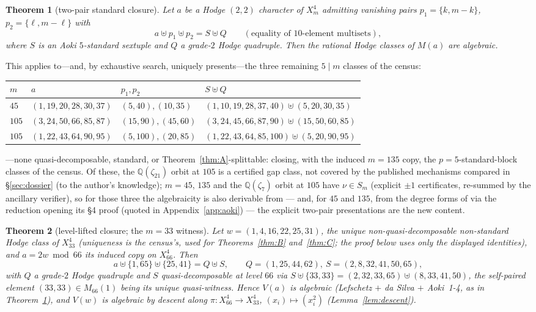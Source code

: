 \documentclass[11pt]{amsart}
\newtheorem{theorem}{Theorem}[section]
\theoremstyle{remark}
\newcommand{\Q}{\mathbb{Q}}
\newcommand{\V}{V}
\newcommand{\zt}{\zeta}
\begin{document}
\begin{theorem}[two-pair standard closure]\label{thm:Aprime}
Let $a$ be a Hodge $(2,2)$ character of $X^4_m$ admitting vanishing pairs $p_1=\{k,m-k\}$,
$p_2=\{\ell,m-\ell\}$ with
\[
a\uplus p_1\uplus p_2=S\uplus Q\qquad(\text{equality of }10\text{-element multisets}),
\]
where $S$ is an Aoki $5$-standard sextuple and $Q$ a grade-$2$ Hodge quadruple. Then the rational Hodge
classes of $M(a)$ are algebraic.
\end{theorem}
This applies to---and, by exhaustive search, uniquely presents---the three remaining $5\mid m$ classes of
the census:
\begin{center}\small
\begin{tabular}{llll}
\toprule
$m$ & $a$ & $p_1,p_2$ & $S\uplus Q$\\
\midrule
$45$ & $(1,19,20,28,30,37)$ & $(5,40),(10,35)$ & $(1,10,19,28,37,40)\uplus(5,20,30,35)$\\
$105$ & $(3,24,50,66,85,87)$ & $(15,90),(45,60)$ & $(3,24,45,66,87,90)\uplus(15,50,60,85)$\\
$105$ & $(1,22,43,64,90,95)$ & $(5,100),(20,85)$ & $(1,22,43,64,85,100)\uplus(5,20,90,95)$\\
\bottomrule
\end{tabular}
\end{center}
---none quasi-decomposable, standard, or Theorem~\ref{thm:A}-splittable: closing, with the
induced $m=135$ copy, the $p=5$-standard-block classes of the census. Of these, the
$\Q(\zt_{21})$ orbit at $105$ is a certified gap class, not covered by the published mechanisms
compared in \S\ref{sec:dossier} (to the author's knowledge); $m=45$, $135$ and the $\Q(\zt_7)$ orbit at $105$
have $\nu\in S_m$ (explicit $\pm1$ certificates, re-summed by the ancillary verifier), so for
those three the algebraicity is also derivable from \cite[Lem.~4.1(iii)]{Aoki00} --- and, for
$45$ and $135$, from the degree forms of \cite[Thm.~0.1(i)]{Aoki00} via the reduction opening
its \S4 proof (quoted in Appendix~\ref{app:aoki}) --- the
explicit two-pair presentations are the new content.

\begin{theorem}[level-lifted closure; the $m=33$ witness]\label{thm:App}
Let $w=(1,4,16,22,25,31)$, the unique non-quasi-decomposable non-standard Hodge class of $X^4_{33}$
(uniqueness is the census's, used for Theorems~\ref{thm:B} and~\ref{thm:C}; the proof below uses
only the displayed identities),
and $a=2w\bmod 66$ its induced copy on $X^4_{66}$. Then
\[
a\uplus\{1,65\}\uplus\{25,41\}=Q\uplus S,\qquad Q=(1,25,44,62),\ S=(2,8,32,41,50,65),
\]
with $Q$ a grade-$2$ Hodge quadruple and $S$ quasi-decomposable at level $66$ via
$S\uplus\{33,33\}=(2,32,33,65)\uplus(8,33,41,50)$, the self-paired element $(33,33)\in M_{66}(1)$
being its unique quasi-witness. Hence $\V(a)$ is algebraic (Lefschetz $+$ da Silva $+$ Aoki~1-4, as in
Theorem~\ref{thm:Aprime}), and $\V(w)$ is algebraic by descent along $\pi\colon X^4_{66}\to X^4_{33}$,
$(x_i)\mapsto(x_i^2)$ (Lemma~\ref{lem:descent}).
\end{theorem}
\end{document}
